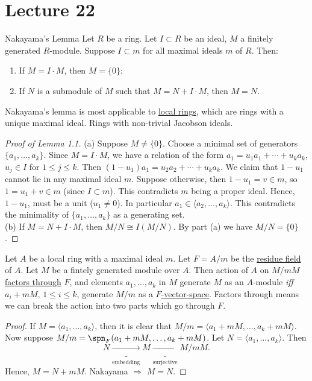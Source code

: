 \documentclass[twoside, openright, fontsize=10pt, headings=big]{scrbook}
\begin{document}
\chapter{Lecture 22}
\begin{lemma}{Nakayama's Lemma}{}
    Let $R$ be a ring. Let $I\subset R$ be an ideal, $M$ a finitely generated $R$-module. Suppose $I\subset m$ for all maximal ideals $m$ of $R$. Then:
    \begin{enumerate}[label=(\alph*)]
        \item If $M=I\cdot M$, then $M=\{0\}$;
        \item If $N$ is a submodule of $M$ such that $M=N+I\cdot M$, then $M=N$.
    \end{enumerate}
\end{lemma}
Nakayama's lemma is most applicable to \underline{local rings}, which are rings with a unique maximal ideal. Rings with non-trivial Jacobson ideals. 
\begin{proof}[Proof of Lemma 1.1]
    (a) Suppose $M\neq\{0\}$. Choose a minimal set of generators $\{a_1,\dots,a_k\}$. Since $M=I\cdot M$, we have a relation of the form $a_1=u_1a_1+\cdots+u_ka_k$, $u_j\in I$ for $1\leq j\leq k$. Then $(1-u_1)a_1=u_2a_2+\cdots+u_ka_k$. We claim that $1-u_1$ cannot lie in any maximal ideal $m$. Suppose otherwise, then $1-u_1=v\in m$, so $1=u_1+v\in m$ (since $I\subset m$). This contradicts $m$ being a proper ideal. Hence, $1-u_1$, must be a unit ($u_1\neq0$). In particular $a_1\in\langle a_2,\dots,a_k \rangle$. This contradicts the minimality of $\{a_1,\dots,a_k\}$ as a generating set. \\
    (b) If $M=N+I\cdot M$, then $M/N\cong I(M/N)$. By part (a) we have $M/N=\{0\}$.
\end{proof}
\begin{corollary}{}{}
    Let $A$ be a local ring with a maximal ideal $m$. Let $F=A/m$ be the \underline{residue field} of $A$. Let $M$ be a fintely generated module over $A$. Then action of $A$ on $M/mM$ \underline{factors through} $F$, and elements $a_1,\dots,a_k$ in $M$ generate $M$ as an $A$-module \textit{iff} $a_i+mM$, $1\leq i\leq k$, generate $M/m$ as a \underline{$F$-vector-space}. Factors through means we can break the action into two parts which go through $F$.
\end{corollary}
\begin{proof}
   If $M=\langle a_1,\dots,a_k \rangle$, then it is clear that $M/m=\langle a_1+mM,\dots,a_k+mM \rangle$.\\
   Now suppose $M/m=\spn_F(a_1+mM,\dots,a_k+mM)$. Let $N=\langle a_1,\dots,a_k \rangle$. Then 
   \[
    N\underbrace{\to}_{\text{embedding}} M\underbrace{\to}_{\text{surjective}} M/mM.
   \]
   Hence, $M=N+mM$. Nakayama $\Rightarrow$ $M=N$.
\end{proof}
\end{document}
